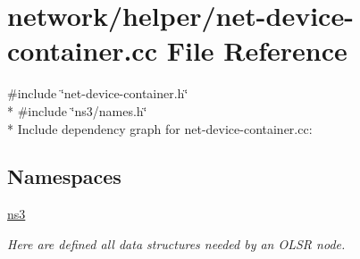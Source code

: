 \hypertarget{net-device-container_8cc}{}\section{network/helper/net-\/device-\/container.cc File Reference}
\label{net-device-container_8cc}
{\ttfamily \#include \char`\"{}net-\/device-\/container.\+h\char`\"{}}\\*
{\ttfamily \#include \char`\"{}ns3/names.\+h\char`\"{}}\\*
Include dependency graph for net-\/device-\/container.cc\+:
\subsection*{Namespaces}
\begin{DoxyCompactItemize}
\item 
 \hyperlink{namespacens3}{ns3}
\begin{DoxyCompactList}\small\item\em Here are defined all data structures needed by an O\+L\+SR node. \end{DoxyCompactList}\end{DoxyCompactItemize}

